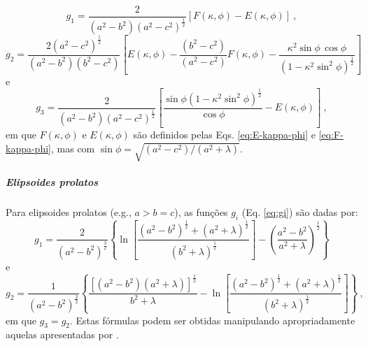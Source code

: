 \begin{equation}
g_{1} = \frac{2}{\left( a^{2} - b^{2} \right) \left( a^{2} - c^{2} \right)^{\frac{1}{2}}}
\left[ F(\kappa, \phi) - E(\kappa, \phi) \right] \: ,
\label{eq:g1-triaxial}
\end{equation}
\begin{equation}
g_{2} = \frac{2 \left( a^{2} - c^{2} \right)^{\frac{1}{2}}}
{\left( a^{2} - b^{2} \right)\left( b^{2} - c^{2} \right)}
\left[ E\left(\kappa, \phi \right) 
- \frac{\left( b^{2} - c^{2} \right)}{\left( a^{2} - c^{2} \right)}
F\left(\kappa, \phi \right) 
- \frac{\kappa^{2} \sin\phi \, \cos\phi}
{\left( 1 - \kappa^{2} \sin^{2}\phi \right)^{\frac{1}{2}}}
\right]
\label{eq:g2-triaxial}
\end{equation}
e
\begin{equation}
g_{3} = \frac{2}{\left( a^{2} - b^{2} \right) \left( a^{2} - c^{2} \right)^{\frac{1}{2}}}
\left[ \frac{\sin\phi \left( 1 - \kappa^{2} \sin^{2}\phi \right)^{\frac{1}{2}}}
{\cos\phi}  - E\left(\kappa, \phi \right) \right]
\: ,
\label{eq:g3-triaxial}
\end{equation}
em que $F(\kappa, \phi)$ e $E(\kappa, \phi)$ são definidos pelas
Eqs. \ref{eq:E-kappa-phi} e \ref{eq:F-kappa-phi},
mas com
$\sin \phi = \sqrt{\left( a^{2} - c^{2} \right)/\left( a^{2} + \lambda \right)}$.

\subparagraph*{Elipsoides prolatos}


Para elipsoides prolatos (e.g., $a > b = c$), as funções
$g_{i}$ (Eq. \ref{eq:gi}) são dadas por:
\begin{equation}
g_{1} =  \frac{2}{\left( a^{2} - b^{2} \right)^{\frac{3}{2}}}
\left\lbrace
\ln \left[ \frac{\left( a^{2} - b^{2} \right)^{\frac{1}{2}} + 
	\left( a^{2} + \lambda \right)^{\frac{1}{2}}}{
	\left( b^{2} + \lambda \right)^{\frac{1}{2}}} \right] -
\left( \frac{a^{2} - b^{2}}{a^{2} + \lambda} \right)^{\frac{1}{2}}
\right\rbrace
\label{eq:g1-prolate}
\end{equation}
e
\begin{equation}
g_{2} =  \frac{1}{\left( a^{2} - b^{2} \right)^{\frac{3}{2}}}
\left\lbrace
\frac{\left[ \left( a^{2} - b^{2} \right)
	\left( a^{2} + \lambda \right) \right]^{\frac{1}{2}}}
{b^{2} + \lambda} -
\ln \left[ \frac{\left( a^{2} - b^{2} \right)^{\frac{1}{2}} + 
	\left( a^{2} + \lambda \right)^{\frac{1}{2}}}{
	\left( b^{2} + \lambda \right)^{\frac{1}{2}}} \right]
\right\rbrace \: ,
\label{eq:g2-prolate}
\end{equation}
em que $g_{3} = g_{2}$.
Estas fórmulas podem ser obtidas manipulando apropriadamente aquelas
apresentadas por \cite{emerson1985}.


